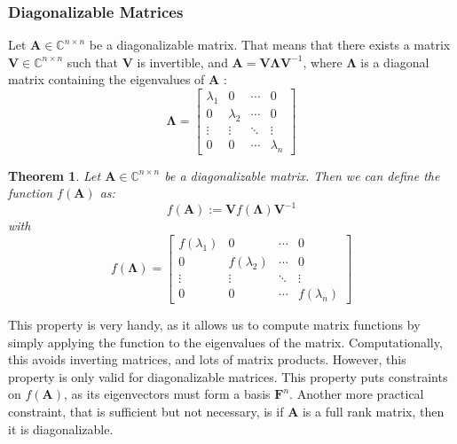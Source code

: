 \documentclass[12pt]{article}
\newtheorem{theorem}{Theorem}
\begin{document}
\subsubsection*{Diagonalizable Matrices}
Let $\mathbf{A}\in\mathbb{C}^{n\times n}$ be a diagonalizable matrix. That means that there exists a matrix $\mathbf{V}\in\mathbb{C}^{n\times n}$ such that $\mathbf{V}$ is invertible, and $\mathbf{A} = \mathbf{V}\mathbf{\Lambda}\mathbf{V}^{-1}$, where $\mathbf{\Lambda}$ is a diagonal matrix containing the eigenvalues of $\mathbf{A}$ :
\begin{equation}
    \mathbf{\Lambda} = \begin{bmatrix}
        \lambda_1 & 0 & \cdots & 0 \\
        0 & \lambda_2 & \cdots & 0 \\
        \vdots & \vdots & \ddots & \vdots \\
        0 & 0 & \cdots & \lambda_n
    \end{bmatrix}
\end{equation}
\begin{theorem}
    Let $\mathbf{A}\in\mathbb{C}^{n\times n}$ be a diagonalizable matrix. Then we can define the function $f(\mathbf{A})$ as:
    \begin{equation}
        f(\mathbf{A}) := \mathbf{V}f(\mathbf{\Lambda})\mathbf{V}^{-1}
    \end{equation}
    with 
    \begin{equation}
        f(\mathbf{\Lambda}) = \begin{bmatrix}
            f(\lambda_1) & 0 & \cdots & 0 \\
            0 & f(\lambda_2) & \cdots & 0 \\
            \vdots & \vdots & \ddots & \vdots \\
            0 & 0 & \cdots & f(\lambda_n)
        \end{bmatrix}
    \end{equation}        
\end{theorem}
This property is very handy, as it allows us to compute matrix functions by simply applying the function to the eigenvalues of the matrix. Computationally, this avoids inverting matrices, and lots of matrix products. However, this property is only valid for diagonalizable matrices. This property puts constraints on $f(\mathbf{A})$, as its eigenvectors must form a basis $\mathbf{F}^n$. Another more practical constraint, that is sufficient but not necessary, is if $\mathbf{A}$ is a full rank matrix, then it is diagonalizable.
\end{document}
